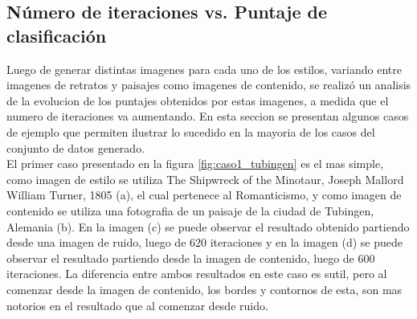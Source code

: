 \documentclass[a4paper,11pt,spanish]{book}
\begin{document}
    \subsection{Número de iteraciones vs. Puntaje de clasificación}
      Luego de generar distintas imagenes para cada uno de los estilos, variando entre imagenes de retratos y paisajes como imagenes de contenido, se realizó un analisis
      de la evolucion de los puntajes obtenidos por estas imagenes, a medida que el numero de iteraciones va aumentando. En esta seccion se presentan algunos casos de ejemplo
      que permiten ilustrar lo sucedido en la mayoria de los casos del conjunto de datos generado.\\
      El primer caso presentado en la figura \ref{fig:caso1_tubingen} es el mas simple, como imagen de estilo se utiliza The Shipwreck of the Minotaur, Joseph Mallord William Turner, 1805 (a),
      el cual pertenece al Romanticismo, y como imagen de contenido se utiliza una fotografia de un paisaje de la ciudad de Tubingen, Alemania (b).
      En la imagen (c) se puede observar el resultado obtenido partiendo desde una imagen de ruido, luego de 620 iteraciones y en la imagen (d) se puede observar el resultado partiendo desde 
      la imagen de contenido, luego de 600 iteraciones.
      La diferencia entre ambos resultados en este caso es sutil, pero al comenzar desde la imagen de contenido, los bordes y contornos de esta, son mas notorios en el resultado
      que al comenzar desde ruido.
\end{document}
